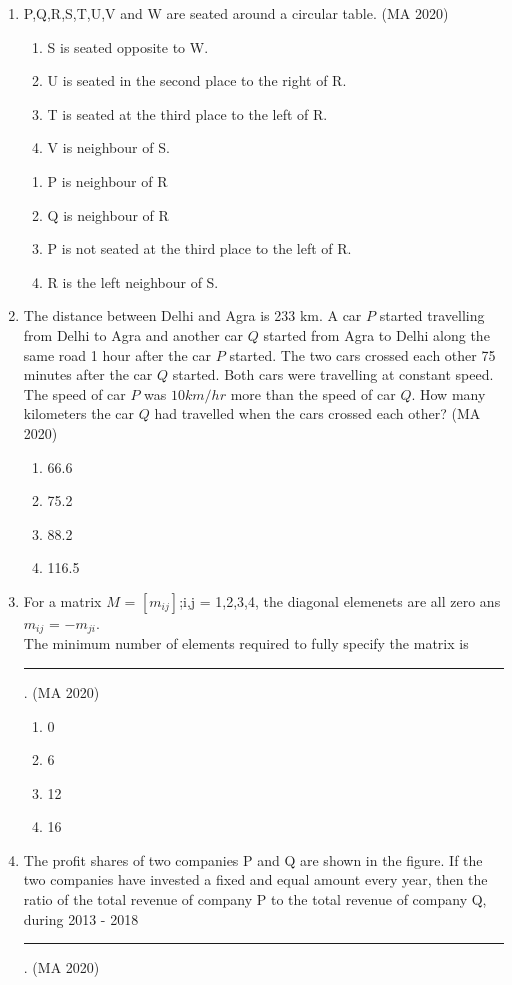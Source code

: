 \documentclass[journal,12pt,onecolumn]{IEEEtran}
\theoremstyle{remark}
\begin{document}
\begin{enumerate}
\item P,Q,R,S,T,U,V and W are seated around a circular table.
\hfill{(MA 2020)}
\begin{enumerate}
\item S is seated opposite to W.
\item U is seated in the second place to the right of R.
\item T is seated at the third place to the left of R.
\item V is neighbour of S.
\end{enumerate}

\begin{enumerate}
\item P is neighbour of R
\item Q is neighbour of R
\item P is not seated at the third place to the left of R.
\item R is the left neighbour of S.
\end{enumerate}

\item The distance between Delhi and Agra is 233 km. A car $P$ started travelling from Delhi to Agra and another car $Q$ started from Agra to Delhi along the same road 1 hour after the car $P$ started. The two cars crossed each other 75 minutes after the car $Q$ started. Both cars were travelling at constant speed. The speed of car $P$ was $10 km/hr$ more than the speed of car $Q$. How many kilometers the car $Q$ had travelled when the cars crossed each other? 
\hfill{(MA 2020)}
\begin{enumerate}
\item 66.6
\item 75.2
\item 88.2
\item 116.5
\end{enumerate}
\item For a matrix $M$ = $[m_{ij}]$;i,j = 1,2,3,4, the diagonal elemenets are all zero ans $m_{ij}$ = $-m_{ji}$.\\The minimum number of elements required to fully specify the matrix is \rule{2cm}{0.4pt}.
\hfill{(MA 2020)}
\begin{enumerate}
\item 0
\item 6
\item 12
\item 16
\end{enumerate}

\item The profit shares of two companies P and Q are shown in the figure. If the two companies have invested a fixed and equal amount every year, then the ratio of the total revenue of company P to the total revenue of company Q, during 2013 - 2018 \rule{2cm}{0.4pt}.
\hfill{(MA 2020)}


\end{enumerate}
\end{document}

